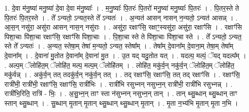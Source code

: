 \documentclass[17pt]{extarticle}
\begin{document}
1. दे॒वा म॑नु॒ष्या॑ मनु॒ष्या॑ दे॒वा दे॒वा म॑नु॒ष्याः᳚ । . म॒नु॒ष्याः᳚ पि॒तरः॑ पि॒तरो॑ मनु॒ष्या॑ मनु॒ष्याः᳚ पि॒तरः॑ । . पि॒तर॒स्ते ते पि॒तरः॑ पि॒तर॒स्ते । . ते᳚ ऽन्यतो॒ ऽन्यत॒स्ते ते᳚ ऽन्यतः॑ । . अ॒न्यत॑ आसन् नासन् न॒न्यतो॒ ऽन्यत॑ आसन्न् । . आ॒स॒न् नसु॑रा॒ असु॑रा आसन् नास॒न् नसु॑राः । . असु॑रा॒ रक्षाꣳ॑सि॒ रक्षाꣳ॒॒स्यसु॑रा॒ असु॑रा॒ रक्षाꣳ॑सि । . रक्षाꣳ॑सि पिशा॒चाः पि॑शा॒चा रक्षाꣳ॑सि॒ रक्षाꣳ॑सि पिशा॒चाः । . पि॒शा॒चा स्ते ते पि॑शा॒चाः पि॑शा॒चा स्ते । . ते᳚ ऽन्यतो॒ ऽन्यत॒ स्ते ते᳚ ऽन्यतः॑ । . अ॒न्यत॒ स्तेषा॒म् तेषा॑ म॒न्यतो॒ ऽन्यत॒ स्तेषा᳚म् । . तेषा᳚म् दे॒वाना᳚म् दे॒वाना॒म् तेषा॒म् तेषा᳚म् दे॒वाना᳚म् । . दे॒वाना॑ मु॒तोत दे॒वाना᳚म् दे॒वाना॑ मु॒त । . उ॒त यद् यदु॒तोत यत् । . यदल्प॒ मल्पं॒ ॅयद् यदल्प᳚म् । . अल्प॒म् ॅलोहि॑त॒म् ॅलोहि॑त॒ मल्प॒ मल्प॒म् ॅलोहि॑तम् । . लोहि॑त॒ मकु॑र्व॒न् नकु॑र्व॒न् ॅलोहि॑त॒म् ॅलोहि॑त॒ मकु॑र्वन्न् । . अकु॑र्व॒न् तत् तदकु॑र्व॒न् नकु॑र्व॒न् तत् । . तद् रक्षाꣳ॑सि॒ रक्षाꣳ॑सि॒ तत् तद् रक्षाꣳ॑सि । . रक्षाꣳ॑सि॒ रात्री॑भी॒ रात्री॑भी॒ रक्षाꣳ॑सि॒ रक्षाꣳ॑सि॒ रात्री॑भिः । . रात्री॑भि रसुभ्नन् नसुभ्न॒न् रात्री॑भी॒ रात्री॑भि रसुभ्नन्न् । . रात्री॑भि॒रिति॒ रात्रि॑ - भिः॒ । . अ॒सु॒भ्न॒न् ताꣳ स्ता न॑सुभ्नन् नसुभ्न॒न् तान् । . तान् थ्सु॒ब्धान् थ्सु॒ब्धान् ताꣳ स्तान् थ्सु॒ब्धान् । . सु॒ब्धान् मृ॒तान् मृ॒तान् थ्सु॒ब्धान् थ्सु॒ब्धान् मृ॒तान् । . मृ॒ता न॒भ्य॑भि मृ॒तान् मृ॒ता न॒भि । \newline
\end{document}

